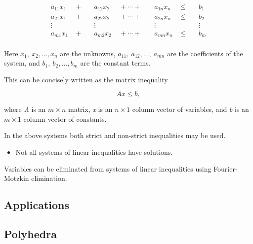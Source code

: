 \begin{align} a _{11} x _1 &\; + \;&& a _{12} x _2 &\; + \cdots + \;&& a _{1n} x _n &\; \leq \;&& b _1 \\ a _{21} x _1 &\; + \;&& a _{22} x _2 &\; + \cdots + \;&& a _{2n} x _n &\; \leq \;&& b _2 \\ \vdots & && \vdots & && \vdots & && \vdots \\ a _{m1} x _1 &\; + \;&& a _{m2} x _2 &\; + \cdots + \;&& a _{mn} x _n &\; \leq \;&& b _m \\ \end{align}

 Here $x _1,\ x _2,...,x _n$ are the unknowns, $a _{11},\ a _{12},...,\ a _{mn}$ are the
 coefficients of the system, and $b _1,\ b _2,...,b _m$ are the constant terms.



This can be concisely written as the matrix inequality



$$Ax \leq b,$$



where \textit{A} is an $m \times n$ matrix, \textit{x} is an $n \times 1$ column vector of
variables, and \textit{b} is an $m \times 1$ column vector of constants.



In the above systems both strict and non-strict inequalities may be used.



\begin{itemize}
    \item Not all systems of linear inequalities have solutions.
\end{itemize}

Variables can be eliminated from systems of linear inequalities using Fourier-Motzkin elimination.




\subsection{Applications}
\label{sss:appl-b5fb}





\subsection{Polyhedra}
\label{sss:poly-9fc8}




